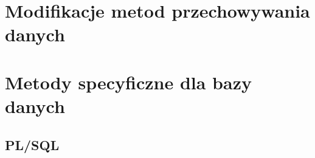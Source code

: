 \documentclass[12pt,a4paper,oneside]{report}
\begin{document}


\chapter{Modifikacje metod przechowywania danych}


\chapter{Metody specyficzne dla bazy danych}
	\section{PL/SQL}

	
	
	

	

	
\end{document}
